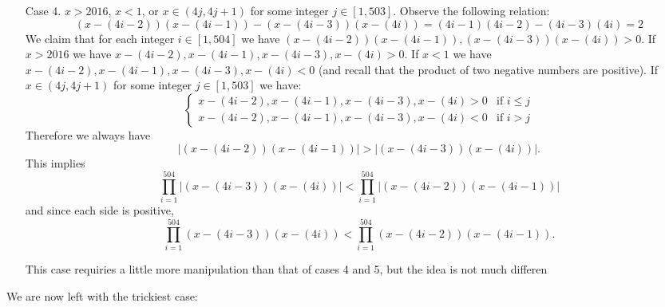 \documentclass[11pt,a4paper]{article}
\begin{document}
\begin{itemize}
\begin{itemize}
\item [Case 4.] $x>2016$, $x<1$, or $x\in (4j, 4j+1)$ for some integer $j\in [1, 503]$. 
Observe the following relation:
$$(x-(4i-2))(x-(4i-1))-(x-(4i-3))(x-(4i))=(4i-1)(4i-2)-(4i-3)(4i)=2$$ 
We claim that for each integer $i\in [1, 504]$ we have 
$(x-(4i-2))(x-(4i-1)), (x-(4i-3))(x-(4i))>0$. 
If $x>2016$ we have $x-(4i-2), x-(4i-1), x-(4i-3), x-(4i) >0$. 
If $x<1$ we have $x-(4i-2), x-(4i-1), x-(4i-3), x-(4i) <0$ (and recall that the product of two negative numbers are positive). 
If $x\in (4j, 4j+1)$ for some integer $j\in [1, 503]$ we have: 
$$\begin{cases} 
x-(4i-2), x-(4i-1), x-(4i-3), x-(4i) >0 & \text{if } i\le j \\ 
x-(4i-2), x-(4i-1), x-(4i-3), x-(4i) <0 & \text{if } i > j 
\end{cases} $$
Therefore we always have 
$$|(x-(4i-2))(x-(4i-1))|>|(x-(4i-3))(x-(4i))|.$$ 
This implies 
$$\displaystyle\prod_{i=1}^{504} |(x-(4i-3))(x-(4i))|<\displaystyle\prod_{i=1}^{504} |(x-(4i-2))(x-(4i-1))|$$ 
and since each side is positive, 
$$\displaystyle\prod_{i=1}^{504} (x-(4i-3))(x-(4i))<\displaystyle\prod_{i=1}^{504} (x-(4i-2))(x-(4i-1)).$$ 

This case requiries a little more manipulation than that of cases 4 and 5, but the idea is not much differen
\end{itemize}

We are now left with the trickiest case: 
\begin{itemize}


\end{itemize}
\end{itemize}
\end{document}
